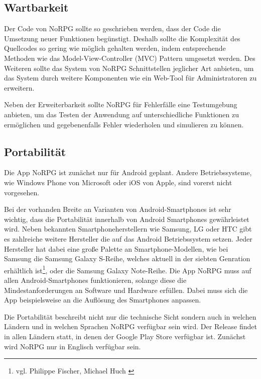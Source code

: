 	\subsection{Wartbarkeit}
		Der Code von NoRPG sollte so geschrieben werden, dass der Code die Umsetzung neuer Funktionen begünstigt. Deshalb sollte die Komplexität des Quellcodes so gering wie möglich gehalten werden, indem entsprechende Methoden wie das Model-View-Controller (MVC) Pattern umgesetzt werden. Des Weiteren sollte das System von NoRPG Schnittstellen jeglicher Art anbieten, um das System durch weitere Komponenten wie ein Web-Tool für Administratoren zu erweitern.
		
		Neben der Erweiterbarkeit sollte NoRPG für Fehlerfälle eine Testumgebung anbieten, um das Testen der Anwendung auf unterschiedliche Funktionen zu ermöglichen und gegebenenfalls Fehler wiederholen und simulieren zu können.
		
	\subsection{Portabilität}
		Die App NoRPG ist zunächst nur für Android geplant. Andere Betriebssysteme, wie Windows Phone von Microsoft oder iOS von Apple, sind vorerst nicht vorgesehen. 
		
		Bei der vorhanden Breite an Varianten von Android-Smartphones ist sehr wichtig, dass die Portabilität innerhalb von Android Smartphones gewährleistet wird. Neben bekannten Smartphoneherstellern wie Samsung, LG oder HTC gibt es zahlreiche weitere Hersteller die auf das Android Betriebssystem setzen. Jeder Hersteller hat dabei eine große Palette an Smartphone-Modellen, wie bei Samsung die Samsung Galaxy S-Reihe, welches aktuell in der siebten Genration erhältlich ist\footnote{vgl. Philippe Fischer, Michael Huch \cite{computerBildSamsung}}, oder die Samsung Galaxy Note-Reihe. Die App NoRPG muss auf allen Android-Smartphones funktionieren, solange diese die Mindestanforderungen an Software und Hardware erfüllen. Dabei muss sich die App beispielsweise an die Auflösung des Smartphones anpassen.
		
		Die Portabilität beschreibt nicht nur die technische Sicht sondern auch in welchen Ländern und in welchen Sprachen NoRPG verfügbar sein wird. Der Release findet in allen Ländern statt, in denen der Google Play Store verfügbar ist. Zunächst wird NoRPG nur in Englisch verfügbar sein.